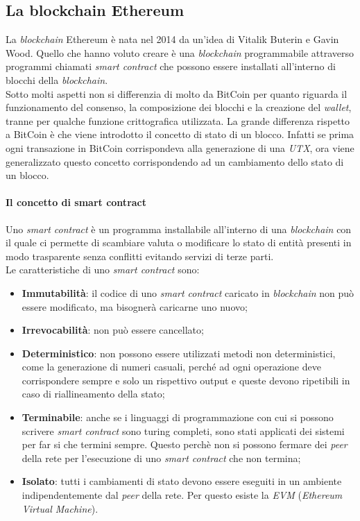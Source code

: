 
\subsection{La blockchain Ethereum}
La \textit{blockchain} Ethereum è nata nel 2014 da un'idea di Vitalik Buterin e Gavin Wood. Quello che hanno voluto creare è una \textit{blockchain} programmabile attraverso programmi chiamati \textit{smart contract} che possono essere installati all'interno di blocchi della \textit{blockchain}. \\

Sotto molti aspetti non si differenzia di molto da BitCoin per quanto riguarda il funzionamento del consenso, la composizione dei blocchi e la creazione del \textit{wallet}, tranne per qualche funzione crittografica utilizzata. La grande differenza rispetto a BitCoin è che viene introdotto il concetto di stato di un blocco. Infatti se prima ogni transazione in BitCoin corrispondeva alla generazione di una \textit{UTX}, ora viene generalizzato questo concetto corrispondendo ad un cambiamento dello stato di un blocco.

\paragraph{Il concetto di smart contract}
Uno \textit{smart contract} è un programma installabile all'interno di una \textit{blockchain} con il quale ci permette di scambiare valuta o modificare lo stato di entità presenti in modo trasparente senza conflitti evitando servizi di terze parti. \\

Le caratteristiche di uno \textit{smart contract} sono:
\begin{itemize}
  \item \textbf{Immutabilità}: il codice di uno \textit{smart contract} caricato in \textit{blockchain} non può essere modificato, ma bisognerà caricarne uno nuovo;
  \item \textbf{Irrevocabilità}: non può essere cancellato;
  \item \textbf{Deterministico}: non possono essere utilizzati metodi non deterministici, come la generazione di numeri casuali, perché ad ogni operazione deve corrispondere sempre e solo un rispettivo output e queste devono ripetibili in caso di riallineamento della stato;
  \item \textbf{Terminabile}: anche se i linguaggi di programmazione con cui si possono scrivere \textit{smart contract} sono turing completi, sono stati applicati dei sistemi per far si che termini sempre. Questo perchè non si possono fermare dei \textit{peer} della rete per l'esecuzione di uno \textit{smart contract} che non termina;
  \item \textbf{Isolato}: tutti i cambiamenti di stato devono essere eseguiti in un ambiente indipendentemente dal \textit{peer} della rete. Per questo esiste la \textit{EVM} (\textit{Ethereum Virtual Machine}).
\end{itemize}

